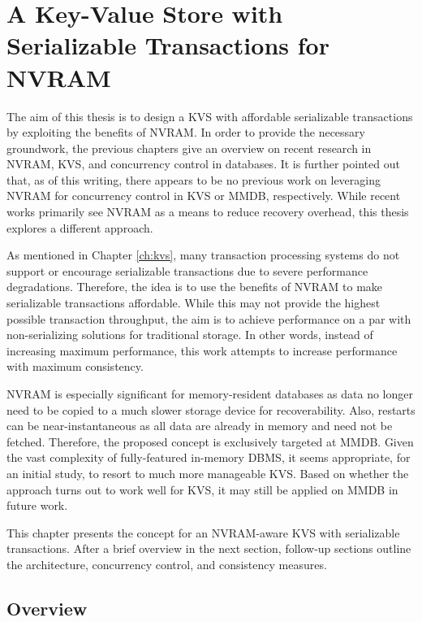 \chapter{A Key-Value Store with Serializable Transactions for NVRAM}
\label{ch:concept}

The aim of this thesis is to design a \ac{KVS} with affordable serializable
transactions by exploiting the benefits of \ac{NVRAM}. In order to provide the
necessary groundwork, the previous chapters give an overview on recent research
in \ac{NVRAM}, \ac{KVS}, and concurrency control in databases. It is further
pointed out that, as of this writing, there appears to be no previous work on
leveraging \ac{NVRAM} for concurrency control in \ac{KVS} or \ac{MMDB},
respectively. While recent works primarily see \ac{NVRAM} as a means to reduce
recovery overhead, this thesis explores a different approach.

As mentioned in Chapter \ref{ch:kvs}, many transaction processing systems do not
support or encourage serializable transactions due to severe performance
degradations. Therefore, the idea is to use the benefits of \ac{NVRAM} to make
serializable transactions affordable. While this may not provide the highest
possible transaction throughput, the aim is to achieve performance on a par with
non-serializing solutions for traditional storage. In other words, instead of
increasing maximum performance, this work attempts to increase performance with
maximum consistency.

\ac{NVRAM} is especially significant for memory-resident databases as data no
longer need to be copied to a much slower storage device for recoverability.
Also, restarts can be near-instantaneous as all data are already in memory and
need not be fetched. Therefore, the proposed concept is exclusively targeted at
\ac{MMDB}. Given the vast complexity of fully-featured in-memory \ac{DBMS}, it
seems appropriate, for an initial study, to resort to much more manageable
\ac{KVS}. Based on whether the approach turns out to work well for \ac{KVS}, it
may still be applied on \ac{MMDB} in future work.

This chapter presents the concept for an \ac{NVRAM}-aware \ac{KVS} with
serializable transactions. After a brief overview in the next section,
follow-up sections outline the architecture, concurrency control, and
consistency measures.

\section{Overview}
\label{ch:concept-overview}


